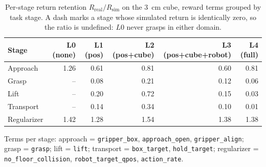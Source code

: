 \begin{table}[h]
\centering
\caption{Per-stage return retention $R_{\mathrm{real}}/R_{\mathrm{sim}}$ on the 3~cm cube, reward terms grouped by task stage. A dash marks a stage whose simulated return is identically zero, so the ratio is undefined: $L0$ never grasps in either domain.}
\label{tab:stage_retention}
\begin{tabular}{lrrrrr}
\hline
\textbf{Stage} & \textbf{L0 (none)} & \textbf{L1 (pos)} & \textbf{L2 (pos+cube)} & \textbf{L3 (pos+cube+robot)} & \textbf{L4 (full)} \\
\hline
Approach & 1.26 & 0.61 & 0.81 & 0.60 & 0.81 \\
Grasp & -- & 0.08 & 0.21 & 0.12 & 0.06 \\
Lift & -- & 0.20 & 0.72 & 0.15 & 0.03 \\
Transport & -- & 0.14 & 0.34 & 0.10 & 0.01 \\
Regularizer & 1.42 & 1.28 & 1.54 & 1.38 & 1.38 \\
\hline
\end{tabular}

\vspace{2pt}
\begin{minipage}{0.95\linewidth}
\footnotesize Terms per stage: approach = \texttt{gripper\_box}, \texttt{approach\_open}, \texttt{gripper\_align}; grasp = \texttt{grasp}; lift = \texttt{lift}; transport = \texttt{box\_target}, \texttt{hold\_target}; regularizer = \texttt{no\_floor\_collision}, \texttt{robot\_target\_qpos}, \texttt{action\_rate}.
\end{minipage}
\end{table}
